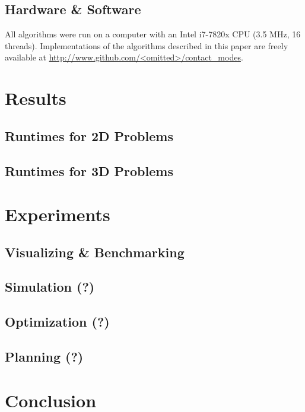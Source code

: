 \documentclass[conference]{IEEEtran}
\begin{document}
\subsection{Hardware \& Software}
All algorithms were run on a computer with an Intel i7-7820x CPU (3.5 MHz, 16
threads). Implementations of the algorithms described in this paper are freely
available at \url{http://www.github.com/<omitted>/contact_modes}.

\section{Results}

\subsection{Runtimes for 2D Problems}

\subsection{Runtimes for 3D Problems}

\section{Experiments}

\subsection{Visualizing \& Benchmarking}

\subsection{Simulation (?)}

\subsection{Optimization (?)}

\subsection{Planning (?)}

\section{Conclusion}


% 

\end{document}
